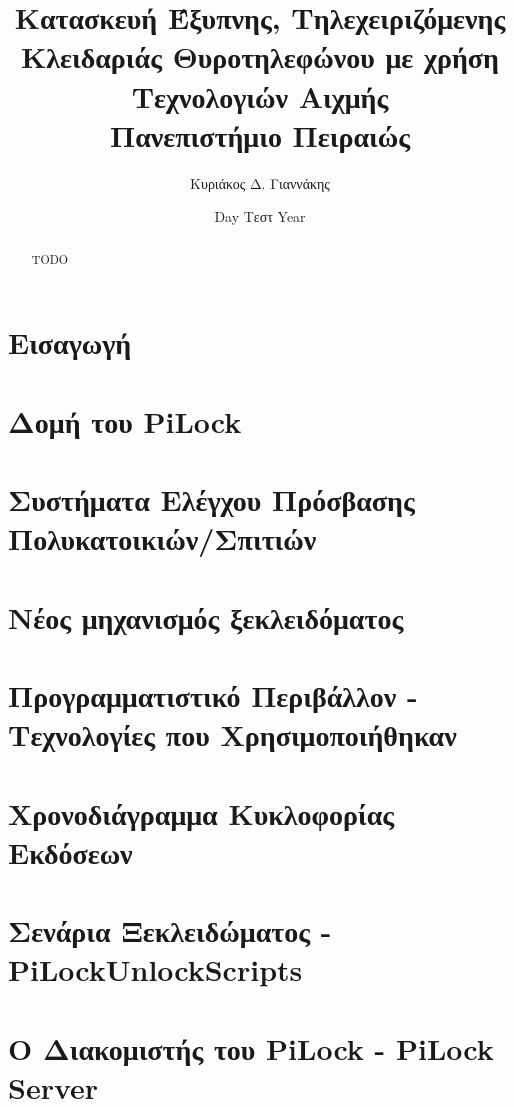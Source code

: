 \documentclass[12pt]{report}
\title{
    {Κατασκευή Έξυπνης, Τηλεχειριζόμενης Κλειδαριάς Θυροτηλεφώνου με χρήση Τεχνολογιών Αιχμής }\\
    {\large Πανεπιστήμιο Πειραιώς}
}
\author{Κυριάκος Δ. Γιαννάκης}
\date{Day Τεστ Year}
\begin{document}
    \maketitle
    
    \begin{abstract}
        TODO
    \end{abstract}
    
    \tableofcontents
    
    \chapter{Εισαγωγή}
    

    \chapter{Δομή του PiLock}
    

    \chapter{Συστήματα Ελέγχου Πρόσβασης Πολυκατοικιών/Σπιτιών}
    

    \chapter{Νέος μηχανισμός ξεκλειδόματος}
    

    \chapter{Προγραμματιστικό Περιβάλλον - Τεχνολογίες που Χρησιμοποιήθηκαν}
    

    \chapter{Χρονοδιάγραμμα Κυκλοφορίας Εκδόσεων}
    

    \chapter{Σενάρια Ξεκλειδώματος - PiLockUnlockScripts}
    

    \chapter{Ο Διακομιστής του PiLock - PiLock Server}
    
\end{document}
